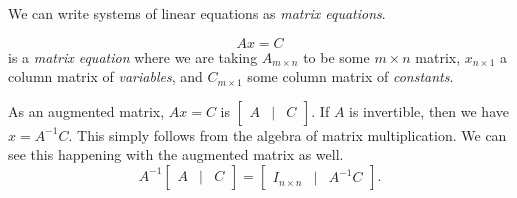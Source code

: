 We can write systems of linear equations as \emph{matrix equations}.

\begin{definition}
\[Ax=C\] is a \emph{matrix equation} where we
    are taking \(A_{m \times n}\) to be some \(m \times n\) matrix, \(x_{n \times 1}\) a column matrix of \emph{variables}, and \(C_{m\times 1}\) some column matrix of \emph{constants}.
\end{definition}

As an augmented matrix, \(Ax=C\) is \(\begin{bmatrix}
    A & \vert & C
\end{bmatrix}.\) If \(A\) is invertible, then we have \(x = A^{-1}C.\) This simply follows from the algebra of matrix multiplication. We can see this happening with the augmented matrix as well.
\[A^{-1}\begin{bmatrix}
    A & \vert & C
\end{bmatrix} = \begin{bmatrix}
    I_{n\times n} & \vert & A^{-1}C
\end{bmatrix}.\]